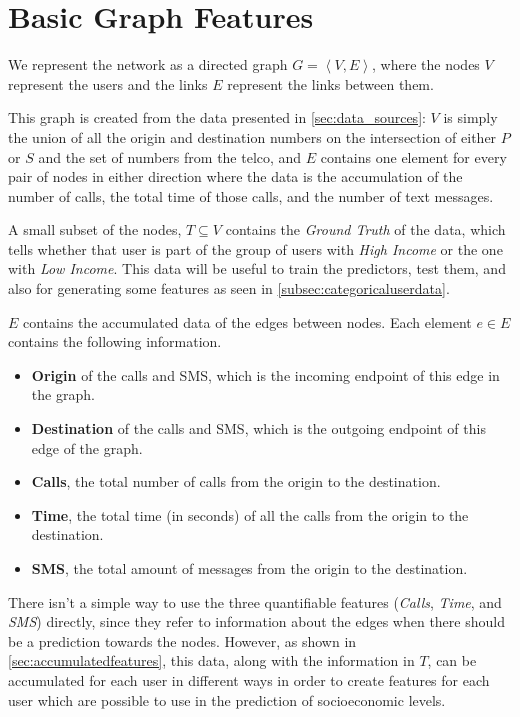 \section{Basic Graph Features}
\label{sec:graphfeatures}

We represent the network as a directed graph $G = \left< V, E \right>$, where the nodes $V$ represent the users and the links $E$ represent the links between them.

This graph is created from the data presented in \cref{sec:data_sources}: $V$ is simply the union of all the origin and destination numbers on the intersection of either $P$ or $S$ and the set of numbers from the telco, and $E$ contains one element for every pair of nodes in either direction where the data is the accumulation of the number of calls, the total time of those calls, and the number of text messages.

A small subset of the nodes, $T \subseteq V$ contains the \emph{Ground Truth} of the data, which tells whether that user is part of the group of users with \emph{High Income} or the one with \emph{Low Income}. This data will be useful to train the predictors, test them, and also for generating some features as seen in \cref{subsec:categoricaluserdata}.

$E$ contains the accumulated data of the edges between nodes. Each element $e \in E$ contains the following information.

\begin{itemize}
	\item \textbf{Origin} of the calls and SMS, which is the incoming endpoint of this edge in the graph.
	\item \textbf{Destination} of the calls and SMS, which is the outgoing endpoint of this edge of the graph.
	\item \textbf{Calls}, the total number of calls from the origin to the destination.
	\item \textbf{Time}, the total time (in seconds) of all the calls from the origin to the destination.
	\item \textbf{SMS}, the total amount of messages from the origin to the destination.
\end{itemize}

There isn't a simple way to use the three quantifiable features (\emph{Calls}, \emph{Time}, and \emph{SMS}) directly, since they refer to information about the edges when there should be a prediction towards the nodes. However, as shown in \cref{sec:accumulatedfeatures}, this data, along with the information in $T$, can be accumulated for each user in different ways in order to create features for each user which are possible to use in the prediction of socioeconomic levels.
